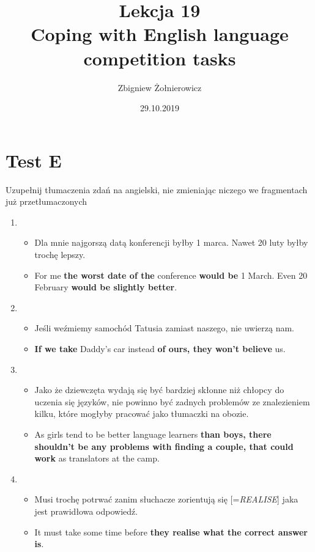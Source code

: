 \documentclass[a4paper]{article}
\begin{document}
\title{{\huge Lekcja 19} \\
{\large Coping with English language competition tasks}}
\author{Zbigniew Żołnierowicz}
\date{29.10.2019}
\maketitle
\section{Test E}
Uzupełnij tłumaczenia zdań na angielski, nie zmieniając niczego we fragmentach już przetłumaczonych
\begin{enumerate}
    \item \begin{itemize}
        \item Dla mnie najgorszą datą konferencji byłby 1 marca. Nawet 20 luty byłby trochę lepszy.
        \item For me {\bf the worst date of the} conference {\bf would be} 1 March. Even 20 February {\bf would be slightly better}.
    \end{itemize}
    \item \begin{itemize}
        \item Jeśli weźmiemy samochód Tatusia zamiast naszego, nie uwierzą nam.
        \item {\bf If we take} Daddy's car instead {\bf of ours, they won't believe} us.
    \end{itemize}
    \item \begin{itemize}
        \item Jako że dziewczęta wydają się być bardziej skłonne niż chłopcy do uczenia się języków, nie powinno być zadnych problemów ze znalezieniem kilku, które mogłyby pracować jako tłumaczki na obozie.
        \item As girls tend to be better language learners {\bf than boys, there shouldn't be any problems with finding a couple, that could work} as translators at the camp.
    \end{itemize}
    \item \begin{itemize}
        \item Musi trochę potrwać zanim słuchacze zorientują się [=\emph{REALISE}] jaka jest prawidłowa odpowiedź.
        \item It must take some time before {\bf they realise what the correct answer is}.
    \end{itemize}

\end{enumerate}
\end{document}
